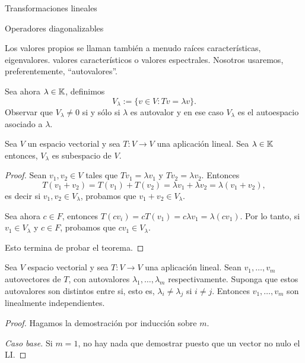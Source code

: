 \begin{chapter}{Transformaciones lineales}
\begin{section}{Operadores diagonalizables}
\begin{definicion}
            Los valores propios se llaman también a menudo raíces características, eigenvalores. valores característicos o valores espectrales. Nosotros usaremos, preferentemente, ``autovalores''.
            
            Sea ahora $\lambda \in \mathbb K$, definimos
            $$
            V_\lambda := \{v \in V: Tv = \lambda v \}.
            $$
            Observar que $V_\lambda \ne 0$ si y sólo si $\lambda$ es autovalor y en ese caso $V_\lambda$  es el autoespacio asociado a $\lambda$. 
        \end{definicion}
        
        
        \begin{teorema}
            Sea $V$ un espacio vectorial y sea $T:V \to V$ una aplicación lineal. Sea $\lambda \in \mathbb K$ entonces, $V_\lambda$  es subespacio de $V$.
        \end{teorema}
        \begin{proof}
            Sean $v_1,v_2 \in V$ tales que $Tv_1 = \lambda v_1$ y $Tv_2 = \lambda v_2$. Entonces
            $$
            T(v_1+v_2) = T(v_1)+ T(v_2) = \lambda v_1 + \lambda v_2 = \lambda (v_1 + v_2),
            $$
            es decir si  $v_1,v_2 \in V_\lambda$, probamos que $v_1+v_2 \in V_\lambda$. 
            
            Sea ahora $c \in F$, entonces $T(cv_i) = cT(v_1) = c\lambda v_1 = \lambda (cv_1)$. Por lo tanto, si  $v_1\in V_\lambda$ y $c \in F$, probamos que $cv_1 \in V_\lambda$.
            
            Esto termina de probar el teorema.
        \end{proof}

        
        
        \begin{teorema}
            Sea $V$ espacio vectorial y sea $T: V \to V$ una aplicación lineal.  Sean $v_1,\ldots,v_m$ autovectores de $T$, con autovalores $\lambda_1,\ldots,\lambda_m$ respectivamente. Suponga que estos  autovalores son distintos entre si, esto es, $\lambda_i \ne \lambda_j$ si $i \ne j$. Entonces $v_1,\ldots,v_m$ son linealmente independientes.
        \end{teorema}
        \begin{proof}
            Hagamos la demostración por inducción sobre $m$.
            
            \textit{Caso base.} Si $m=1$, no hay nada que demostrar puesto que un vector no nulo el LI.
            
        
            

\end{proof}
\end{section}
\end{chapter}
